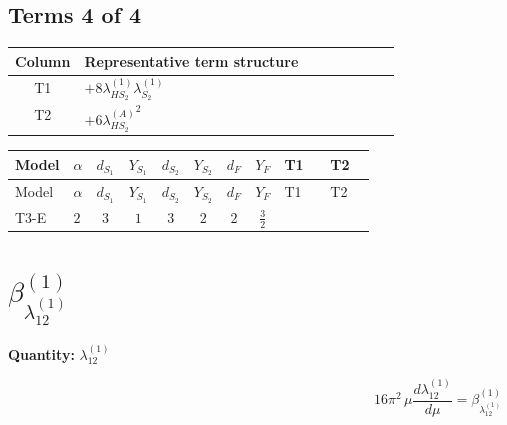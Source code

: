 \documentclass[8pt]{article}
\begin{document}
\begin{landscape}
\subsection*{Terms 4 of 4}
\begin{center}
\begin{tabular}{@{}c >{\raggedright\arraybackslash}p{0.82\linewidth}@{}}
\toprule
Column & Representative term structure \\
\midrule
T1 & \(\displaystyle +8 {\lambda_{HS_2}^{(1)}} {\lambda_{S_2}^{(1)}}\) \\
\midrule
T2 & \(\displaystyle +6 {\lambda_{HS_2}^{(A)}}^2\) \\
\midrule
\bottomrule
\end{tabular}
\end{center}
\smallskip
\tiny
\begin{longtable}{@{}llcccccc >{\raggedright\arraybackslash}p{0.21\linewidth} >{\raggedright\arraybackslash}p{0.21\linewidth}@{}}
\toprule
Model & $\alpha$ & $d_{S_1}$ & $Y_{S_1}$ & $d_{S_2}$ & $Y_{S_2}$ & $d_F$ & $Y_F$ & T1 & T2 \\
\midrule
\endfirsthead
\toprule
Model & $\alpha$ & $d_{S_1}$ & $Y_{S_1}$ & $d_{S_2}$ & $Y_{S_2}$ & $d_F$ & $Y_F$ & T1 & T2 \\
\midrule
\endhead
T3-E & $2$ & $3$ & $1$ & $3$ & $2$ & $2$ & $\frac{3}{2}$ & \scriptsize\adjustbox{max width=\linewidth}{$\begin{gathered} +8 {\lambda_{HS_2}^{(1)}} {\lambda_{S_2}^{(1)}}\end{gathered}$} & \scriptsize\adjustbox{max width=\linewidth}{$\begin{gathered} +6 {\lambda_{HS_2}^{(A)}}^2\end{gathered}$} \\
\midrule
\bottomrule
\end{longtable}
\clearpage
\section*{$\beta_{\lambda_{12}^{(1)}}^{(1)}$}
\noindent\textbf{Quantity: }$\lambda_{12}^{(1)}$\par\smallskip
\[16\pi^2\,\mu\frac{d \lambda_{12}^{(1)}}{d\mu}=\beta_{\lambda_{12}^{(1)}}^{(1)}\]

\end{landscape}
\end{document}
